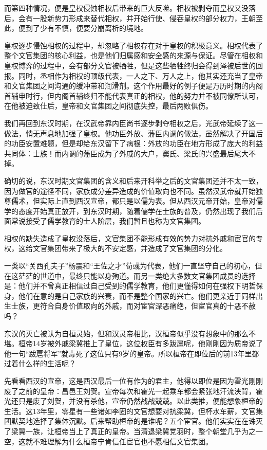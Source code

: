 \documentclass[
]{book}
\begin{document}
而第四种情况，便是皇权侵蚀相权后带来的巨大反噬。相权被剥夺而皇权又没落后，会有一股新势力形成来替代相权，并开始行使、侵吞皇权的部分权力，王朝至此，便到了少有不慎，便要分崩离析的境地。

皇权逐步侵蚀相权的过程中，却忽略了相权存在对于皇权的积极意义。相权代表了整个文官集团的核心利益，也是他们归属感和安全感的来源与保证。尽管在相权和皇权博弈的过程中，会有部分文官被牺牲，但是这些牺牲终归会得到泽被后世的回报。同时，丞相作为相权的顶级代表，一人之下、万人之上，他其实还充当了皇帝和文官集团之间沟通的缓冲带和润滑剂。这个作用最好的例子便是万历时期的内阁首辅申时行，但内阁首辅终归不能代表真正的相权，他的努力并不被同僚所认可，在他被迫致仕后，皇帝和文官集团之间彻底失控，最后两败俱伤。

我们再回到东汉时期，在汉武帝靠内臣尚书逐步剥夺相权之后，光武帝延续了这一做法，悄无声息地加强了皇权。他功臣外放、藩臣内调的做法，虽然解决了开国后的功臣安置难题，但是却给东汉留下了病根：外放的功臣在地方形成了庞大的利益共同体：士族！而内调的藩臣成为了外戚的大户，窦氏、梁氏的兴盛最后尾大不掉。

确切的说，东汉时期文官集团的含义和后来开科举之后的文官集团还并不太一致，因为做官的途径不同，家族成分差异造成的价值取向也不同。虽然汉武帝就开始独尊儒术，但实际上直到西汉宣帝，都只是以儒为表。但从西汉元帝开始，皇帝对儒学的态度开始真正放开，到东汉时期，随着儒学在士族的普及，仍然出现了我们后面常说接受了儒学教育的士人阶层，我们暂且也称为文官集团。

相权的缺失造成了皇权没落后，文官集团不能形成有效的势力对抗外戚和宦官的专权，这给文官集团带来了极大的不安定感，并造成了文官集团的分化。

一类以``关西孔夫子''杨震和``王佐之才''荀彧为代表，他们一直坚守自己的初心，但在这茫茫的世道中，最终只能以身殉道。而另一类绝大多数文官集团成员的选择是：他们并不曾真正相信过自己受到的儒学教育，他们更懂得如何在强权下明哲保身，他们在意的是自己家族的兴衰，而不是整个国家的兴亡。他们更亲近于同样出生士族，更符合自身价值取向的外戚，而对宦官深恶痛绝，但宦官真的十恶不赦吗？

东汉的灭亡被认为自桓灵始，但和汉灵帝相比，汉桓帝似乎没有想象中的那么不堪。桓帝14岁被外戚梁冀推上了皇位，这位权臣有多跋扈呢，他刚刚因为质帝说了他一句``跋扈将军''就毒死了这位只有9岁的皇帝。所以桓帝在即位后的前13年里都过着什么样的生活呢？

先看看西汉的宣帝，这是西汉最后一位有作为的君主，他得以即位是因为霍光刚刚废了之前的皇帝：昌邑王刘贺。宣帝每次和霍光一起乘车都会紧张地汗流浃背，霍光还只是废了刘贺，并没有杀他，宣帝仍然战战兢兢。以此类推，便能想象桓帝的生活。这13年里，零星有一些诸如李固的文官想要对抗梁冀，但杯水车薪，文官集团默契地选择了集体沉默。后来帮助桓帝的是谁呢？五个宦官。他们实实在在诛灭了梁冀一族，让桓帝当上了真正的皇帝。当清退梁冀党羽时，整个朝堂几乎为之一空，这就不难理解为什么桓帝宁肯信任宦官也不愿相信文官集团。
\end{document}
